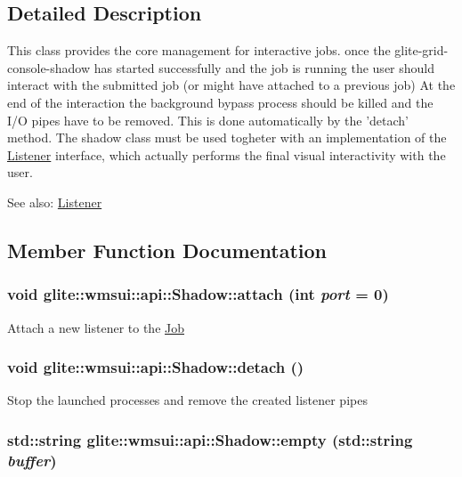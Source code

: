 \subsection{Detailed Description}
This class provides the core management for interactive jobs. once the glite-grid-console-shadow has started successfully and the job is running the user should interact with the submitted job (or might have attached to a previous job) At the end of the interaction the background bypass process should be killed and the I/O pipes have to be removed. This is done automatically by the 'detach' method. The shadow class must be used togheter with an implementation of the \hyperlink{classglite_1_1wmsui_1_1api_1_1Listener}{Listener} interface, which actually performs the final visual interactivity with the user. \begin{Desc}
\item[See also:]\hyperlink{classglite_1_1wmsui_1_1api_1_1Listener}{Listener} \end{Desc}




\subsection{Member Function Documentation}
\hypertarget{classglite_1_1wmsui_1_1api_1_1Shadow_a0}{
\subsubsection[attach]{\setlength{\rightskip}{0pt plus 5cm}void glite::wmsui::api::Shadow::attach (int {\em port} = 0)}}
\label{classglite_1_1wmsui_1_1api_1_1Shadow_a0}


Attach a new listener to the \hyperlink{classglite_1_1wmsui_1_1api_1_1Job}{Job} \hypertarget{classglite_1_1wmsui_1_1api_1_1Shadow_a2}{
\subsubsection[detach]{\setlength{\rightskip}{0pt plus 5cm}void glite::wmsui::api::Shadow::detach ()}}
\label{classglite_1_1wmsui_1_1api_1_1Shadow_a2}


Stop the launched processes and remove the created listener pipes \hypertarget{classglite_1_1wmsui_1_1api_1_1Shadow_a1}{
\subsubsection[empty]{\setlength{\rightskip}{0pt plus 5cm}std::string glite::wmsui::api::Shadow::empty (std::string {\em buffer})}}
\label{classglite_1_1wmsui_1_1api_1_1Shadow_a1}


